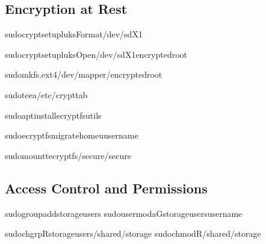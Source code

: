 \documentclass[letterpaper,10pt,english]{sphinxmanual}
\begin{document}
\subsection{Encryption at Rest}
\label{\detokenize{best-practices:encryption-at-rest}}
\sphinxAtStartPar
{}

\begin{sphinxVerbatim}[commandchars=\\\{\}]
sudocryptsetupluksFormat/dev/sdX1

sudocryptsetupluksOpen/dev/sdX1encrypted\PYGZus{}root

sudomkfs.ext4/dev/mapper/encrypted\PYGZus{}root

sudotee\PYGZhy{}a/etc/crypttab
\end{sphinxVerbatim}

\sphinxAtStartPar
{}

\begin{sphinxVerbatim}[commandchars=\\\{\}]
sudoaptinstallecryptfs\PYGZhy{}utils

sudoecryptfs\PYGZhy{}migrate\PYGZhy{}home\PYGZhy{}uusername

sudomount\PYGZhy{}tecryptfs/secure/secure
\end{sphinxVerbatim}


\subsection{Access Control and Permissions}
\label{\detokenize{best-practices:access-control-and-permissions}}
\sphinxAtStartPar
{}

\begin{sphinxVerbatim}[commandchars=\\\{\}]

sudogroupaddstorage\PYGZhy{}users
sudousermod\PYGZhy{}a\PYGZhy{}Gstorage\PYGZhy{}usersusername

sudochgrp\PYGZhy{}Rstorage\PYGZhy{}users/shared/storage
sudochmod\PYGZhy{}R/shared/storage
\end{sphinxVerbatim}
\end{document}
